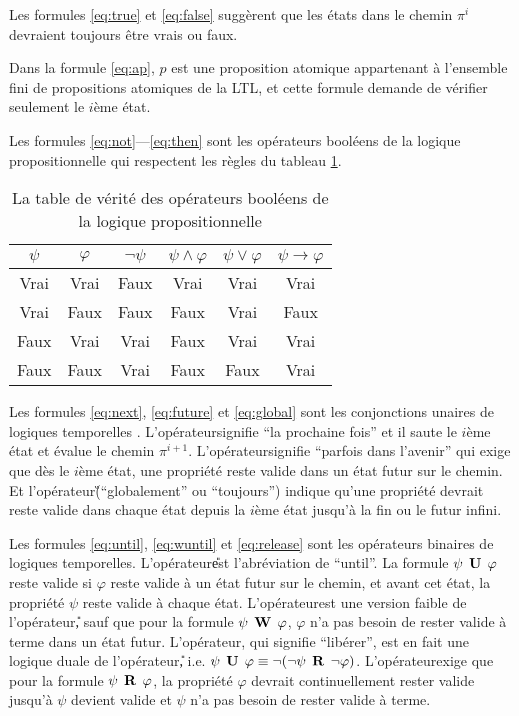 Les formules \ref{eq:true} et \ref{eq:false} suggèrent que les états dans le chemin $\pi^i$ devraient toujours être vrais ou faux.

Dans la formule \ref{eq:ap}, $p$ est une proposition atomique appartenant à l'ensemble fini de propositions atomiques de la LTL, et cette formule demande de vérifier seulement le $i$ème état.

Les formules \ref{eq:not}---\ref{eq:then} sont les opérateurs booléens de la logique propositionnelle qui respectent les règles du tableau \ref{table:prologic}.

\begin{table}[h]
\centering
\begin{tabular}{|c|c|c|c|c|c|}
\hline
$\psi$ & $\varphi$ & $\neg\psi$ & $\psi \wedge \varphi$ & $\psi \vee \varphi$ & $\psi \rightarrow \varphi$ \\
\hline
Vrai & Vrai & Faux & Vrai & Vrai & Vrai \\
\hline
Vrai & Faux & Faux & Faux & Vrai & Faux \\
\hline
Faux & Vrai & Vrai & Faux & Vrai & Vrai \\
\hline
Faux & Faux & Vrai & Faux & Faux & Vrai \\
\hline
\end{tabular}
\caption{La table de vérité des opérateurs booléens de la logique propositionnelle}
\label{table:prologic}
\end{table}

Les formules \ref{eq:next}, \ref{eq:future} et \ref{eq:global} sont les conjonctions unaires de logiques temporelles . L'opérateur\X signifie ``la prochaine fois'' et il saute le $i$ème état et évalue le chemin $\pi^{i + 1}$. L'opérateur\F signifie ``parfois dans l'avenir'' qui exige que dès le $i$ème état, une propriété reste valide dans un état futur sur le chemin. Et l'opérateur\G (``globalement'' ou ``toujours'') indique qu'une propriété devrait reste valide dans chaque état depuis la $i$ème état jusqu'à la fin ou le futur infini.

Les formules \ref{eq:until}, \ref{eq:wuntil} et \ref{eq:release} sont les opérateurs binaires de logiques temporelles. L'opérateur\U est l'abréviation de ``until''. La formule $\psi \mathrel{\mbox{\,\textbf{U}}}\, \varphi$ reste valide si $\varphi$ reste valide à un état futur sur le chemin, et avant cet état, la propriété $\psi$ reste valide à chaque état. L'opérateur\W est une version faible de l'opérateur\U, sauf que pour la formule $\psi \mathrel{\mbox{\,\textbf{W}}}\, \varphi$, $\varphi$ n'a pas besoin de rester valide à terme dans un état futur. L'opérateur\R, qui signifie ``libérer'', est en fait une logique duale de l'opérateur\U, i.e. $\psi \mathrel{\mbox{\,\textbf{U}}}\, \varphi \equiv \neg (\neg \psi \mathrel{\mbox{\,\textbf{R}}}\, \neg \varphi)$. L'opérateur\R exige que pour la formule $\psi \mathrel{\mbox{\,\textbf{R}}}\, \varphi$, la propriété $\varphi$ devrait continuellement rester valide jusqu'à $\psi$ devient valide et $\psi$ n'a pas besoin de rester valide à terme.

